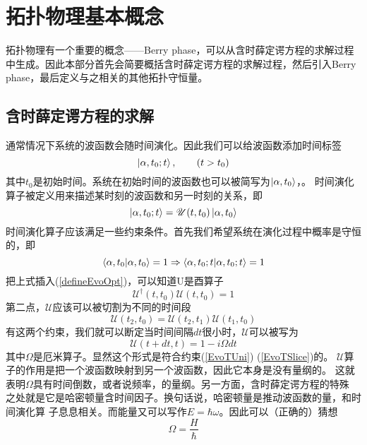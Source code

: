 \chapter{拓扑物理基本概念}
拓扑物理有一个重要的概念——Berry phase，可以从含时薛定谔方程的求解过程中生成。因此本部分首先会简要概括含时薛定谔方程的求解过程，然后引入Berry phase，最后定义与之相关的其他拓扑守恒量。
\section{含时薛定谔方程的求解}
通常情况下系统的波函数会随时间演化。因此我们可以给波函数添加时间标签
\begin{equation}
  \ket{\alpha, t_0; t}, \qquad (t > t_0)
\end{equation}
其中$t_0$是初始时间。系统在初始时间的波函数也可以被简写为$\ket{\alpha, t_0}$，。
  时间演化算子被定义用来描述某时刻的波函数和另一时刻的关系，即
  \begin{equation}
    \ket{\alpha, t_0; t} = \mathscr{U}(t, t_0)\ket{\alpha, t_0}
    \label{defineEvoOpt}
  \end{equation}
时间演化算子应该满足一些约束条件。首先我们希望系统在演化过程中概率是守恒的，即
  \begin{equation}
    \braket{\alpha, t_0 | \alpha, t_0} = 1 \Rightarrow \braket{\alpha, t_0; t | \alpha, t_0; t} = 1
  \end{equation}
把上式插入(\ref{defineEvoOpt})，可以知道U是酉算子
\begin{equation}
  \mathscr{U}^\dagger(t, t_0)  \mathscr{U}(t, t_0) = 1
\label{EvoTUni}
\end{equation}
第二点，$\mathscr{U}$应该可以被切割为不同的时间段
\begin{equation}
\mathscr{U}(t_2, t_0) = \mathscr{U}(t_2, t_1) \mathscr{U}(t_1, t_0)
\label{EvoTSlice}
\end{equation}
有这两个约束，我们就可以断定当时间间隔$dt$很小时，$\mathscr{U}$可以被写为
\begin{equation}
\mathscr{U}(t + dt, t) = 1 - i \Omega dt
\end{equation}
其中$\Omega$是厄米算子。显然这个形式是符合约束(\ref{EvoTUni}) (\ref{EvoTSlice})的。
$\mathscr{U}$算子的作用是把一个波函数映射到另一个波函数，因此它本身是没有量纲的。
这就表明$\Omega$具有时间倒数，或者说频率，的量纲。另一方面，含时薛定谔方程的特殊
之处就是它是哈密顿量含时间因子。换句话说，哈密顿量是推动波函数的量，和时间演化算
子息息相关。而能量又可以写作$E = \hbar \omega$。因此可以（正确的）猜想
\begin{equation}
  \Omega = \frac{H}{\hbar}
\end{equation}
